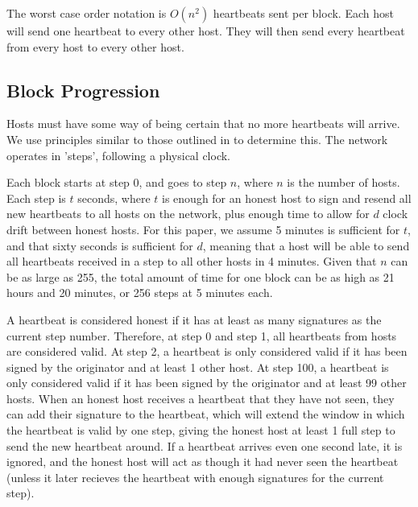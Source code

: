 \documentclass[twocolumn]{article}
\begin{document}
The worst case order notation is $O(n^2)$ heartbeats sent per block.
Each host will send one heartbeat to every other host.
They will then send every heartbeat from every host to every other host.

\subsection{Block Progression}
Hosts must have some way of being certain that no more heartbeats will arrive.
We use principles similar to those outlined in \cite{timeout} to determine this.
The network operates in 'steps', following a physical clock.

Each block starts at step 0, and goes to step $n$, where $n$ is the number of hosts.
Each step is $t$ seconds, where $t$ is enough for an honest host to sign and resend all new heartbeats to all hosts on the network, plus enough time to allow for $d$ clock drift between honest hosts.
For this paper, we assume 5 minutes is sufficient for $t$, and that sixty seconds is sufficient for $d$, meaning that a host will be able to send all heartbeats received in a step to all other hosts in 4 minutes.
Given that $n$ can be as large as 255, the total amount of time for one block can be as high as 21 hours and 20 minutes, or 256 steps at 5 minutes each.

A heartbeat is considered honest if it has at least as many signatures as the current step number.
Therefore, at step 0 and step 1, all heartbeats from hosts are considered valid.
At step 2, a heartbeat is only considered valid if it has been signed by the originator and at least 1 other host.
At step 100, a heartbeat is only considered valid if it has been signed by the originator and at least 99 other hosts.
When an honest host receives a heartbeat that they have not seen, they can add their signature to the heartbeat, which will extend the window in which the heartbeat is valid by one step, giving the honest host at least 1 full step to send the new heartbeat around.
If a heartbeat arrives even one second late, it is ignored, and the honest host will act as though it had never seen the heartbeat (unless it later recieves the heartbeat with enough signatures for the current step).
\end{document}
